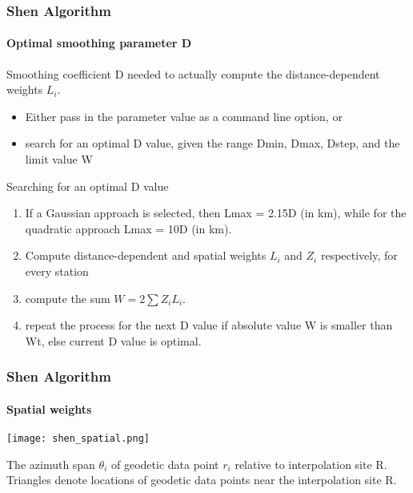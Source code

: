 \begin{frame}
  \frametitle{Shen Algorithm}
  \framesubtitle{Optimal smoothing parameter D}
  \label{ch2:}
 
  Smoothing coefficient D needed to actually compute the distance-dependent weights  $L_{i}$.
 
  \begin{itemize}
    \item Either pass in the parameter value as a command line option, or
    \item search for an optimal D value, given the range Dmin, Dmax, Dstep, and the limit value W
  \end{itemize}
  
  Searching for an optimal D value
  
  \begin{enumerate}
    \item If a Gaussian approach is selected, then Lmax = 2.15D (in km), while for the quadratic approach Lmax = 10D (in km).
    \item Compute distance-dependent and spatial weights $ L_{i} $ and $ Z_{i} $ respectively, for every station
    \item compute the sum $ W = 2\sum Z_{i} L_{i} $.
    \item repeat the process for the next D value if absolute value W is smaller than Wt, else current D value is optimal.
  \end{enumerate}
 
 

\end{frame}
\note{}

\note{}

\begin{frame}
  \frametitle{Shen Algorithm}
  \framesubtitle{Spatial weights}
  \label{ch2:}
  
   
  \begin{center}
    \texttt{[image: shen\_spatial.png]} 
    
    \citep{Shen2015}
  \end{center}
  
  The azimuth span $\theta_i$ of geodetic data point $r_i$ relative to interpolation site R. Triangles denote locations of geodetic data points near the interpolation site R.
  
\end{frame}
\note{}

